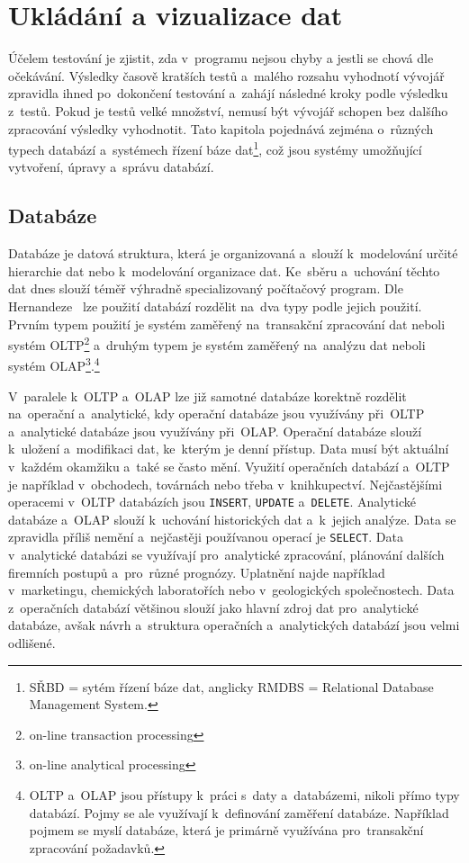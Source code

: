 \chapter{Ukládání a vizualizace dat}
\label{chapter:ukladani_a_vizualizace_dat}
Účelem testování je zjistit, zda v~programu nejsou chyby a jestli se chová dle očekávání. Výsledky časově kratších
testů a~malého rozsahu vyhodnotí vývojář zpravidla ihned po~dokončení testování a~zahájí následné kroky podle
výsledku z~testů. Pokud je testů velké množství, nemusí být vývojář schopen bez dalšího zpracování výsledky
vyhodnotit.
Tato kapitola pojednává zejména o~různých typech databází a~systémech řízení báze dat\footnote{SŘBD = sytém řízení
báze dat, anglicky RMDBS = Relational Database Management System.}, což jsou systémy umožňující vytvoření, úpravy
a~správu databází.

\section{Databáze}
\label{section:databaze}
Databáze je datová struktura, která je organizovaná a~slouží k~modelování určité hierarchie dat nebo k~modelování
organizace dat. Ke~sběru a~uchování těchto dat dnes slouží téměř výhradně specializovaný počítačový program.
Dle Hernandeze~\cite{DatabaseDesignForMereMortlas} lze použití databází rozdělit na~dva typy podle jejich použití.
Prvním typem použití je systém zaměřený na~transakční zpracování dat neboli systém OLTP\footnote{on-line transaction
processing} a~druhým typem je systém zaměřený na~analýzu dat neboli systém OLAP\footnote{on-line analytical processing}.\footnote{OLTP a~OLAP jsou přístupy k~práci s~daty a~databázemi, nikoli přímo typy databází. Pojmy se ale využívají k~definování zaměření databáze. Například pojmem  se myslí databáze, která je primárně využívána pro~transakční zpracování požadavků.}

V~paralele k~OLTP a~OLAP lze již samotné databáze korektně rozdělit na~operační a~analytické, kdy operační databáze
jsou využívány při~OLTP a~analytické databáze jsou využívány při~OLAP.
Operační databáze slouží k~uložení a~modifikaci dat, ke~kterým je denní přístup. Data musí být aktuální v~každém
okamžiku a~také se často mění. Využití operačních databází a~OLTP je například v~obchodech, továrnách nebo třeba
v~knihkupectví. Nejčastějšími operacemi v~OLTP databázích jsou \verb|INSERT|, \verb|UPDATE| a~\verb|DELETE|.
Analytické databáze a~OLAP slouží k~uchování historických dat a~k~jejich analýze. Data se zpravidla příliš nemění
a~nejčastěji používanou operací je \verb|SELECT|. Data v~analytické databázi se využívají pro~analytické zpracování,
plánování dalších firemních postupů a~pro~různé prognózy. Uplatnění najde například v~marketingu, chemických
laboratořích nebo v~geologických společnostech.
Data z~operačních databází většinou slouží jako hlavní zdroj dat pro~analytické databáze, avšak návrh a~struktura operačních a~analytických databází jsou velmi odlišené.~\cite{DatabaseDesignForMereMortlas}

